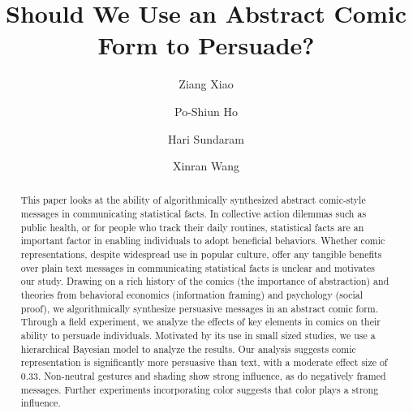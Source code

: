 \documentclass[format=sigchi, natbib=false, review=true, authordraft=false, anonymous=true, screen=true]{acmart}
\begin{document}
\title[The Abstract Comic Form for Persuasion]{Should We Use an Abstract Comic Form to Persuade?}


\author{Ziang Xiao}
\author{Po-Shiun Ho}
\author{Hari Sundaram}
\author{Xinran Wang}




\begin{abstract}
 This paper looks at the ability of algorithmically synthesized abstract comic-style messages in communicating statistical facts. In collective action dilemmas such as public health, or for people who track their daily routines, statistical facts are an important factor in enabling individuals to adopt beneficial behaviors. Whether comic representations, despite widespread use in popular culture, offer any tangible benefits over plain text messages in communicating statistical facts is unclear and motivates our study. Drawing on a rich history of the comics (the importance of abstraction) and theories from behavioral economics (information framing) and psychology (social proof), we algorithmically synthesize persuasive messages in an abstract comic form. Through a field experiment, we analyze the effects of key elements in comics on their ability to persuade individuals. Motivated by its use in small sized studies, we use a hierarchical Bayesian model to analyze the results. Our analysis suggests comic representation is significantly more persuasive than text, with a moderate effect size of 0.33. Non-neutral gestures and shading show strong influence, as do negatively framed messages. Further experiments incorporating color suggests that color plays a strong influence.
\end{abstract}
\end{document}
